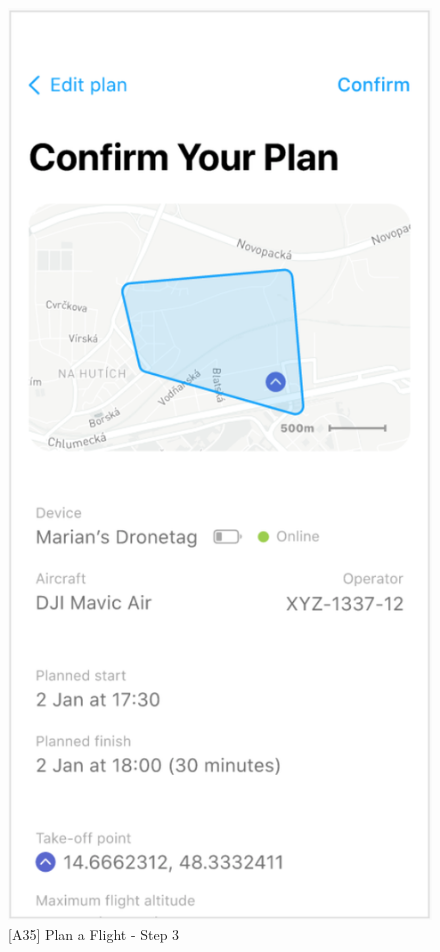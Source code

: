 \begin{figure}
    \centering
    \begin{minipage}{.45\textwidth}
        \centering
        \includegraphics[width=.7\linewidth]{assets/user_interface_design/flight/plan_a_flight_step_3.png}
        \caption{[A35] Plan a Flight - Step 3}
        \label{fig:plan_a_flight_3}
    \end{minipage}%
    \hspace{.05\linewidth}
    \begin{minipage}{.45\textwidth}
        \centering

\end{minipage}
\end{figure}
